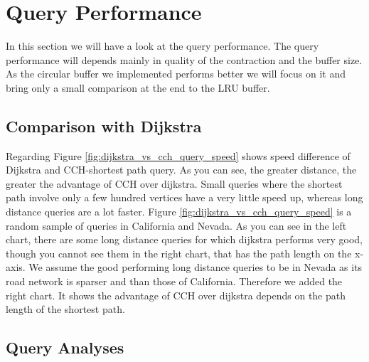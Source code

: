 

\section{Query Performance}

In this section we will have a look at the query performance. The query performance will depends mainly in quality of the contraction and the buffer size. 
As the circular buffer we implemented performs better we will focus on it and bring only a small comparison at the end to the LRU buffer.


\subsection{Comparison with Dijkstra}

Regarding Figure \ref{fig:dijkstra_vs_cch_query_speed} shows speed difference of Dijkstra and CCH-shortest path query. As you can see, the greater distance, the greater the advantage of CCH over dijkstra. Small queries where the shortest path involve only a few hundred vertices have a very little speed up,
whereas long distance queries are a lot faster. Figure \ref{fig:dijkstra_vs_cch_query_speed} is a random sample of queries in California and Nevada. As you can
see in the left chart, there are some long distance queries for which dijkstra performs very good, though you cannot see them in the right chart, that has the path 
length on the x-axis. We assume the good performing long distance queries to be in Nevada as its road network is sparser and than those of California. Therefore we added the right chart.
It shows the advantage of CCH over dijkstra depends on the path length of the shortest path.



\subsection{Query Analyses}

